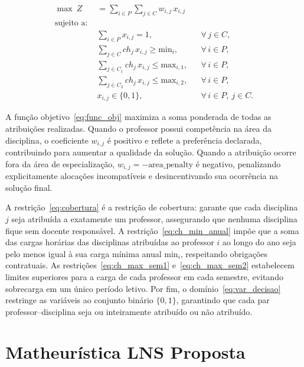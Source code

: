 \begin{subequations} \label{eq:modelo_pdd}
\begin{align}
  \max\ Z \quad & = \sum_{i\in P}\sum_{j\in C} w_{i,j}\,x_{i,j} \label{eq:func_obj} \\[4pt]
  \text{sujeito a:} \nonumber \\
  & \sum_{i\in P} x_{i,j} = 1, && \forall\, j\in C, \label{eq:cobertura} \\
  & \sum_{j\in C} ch_j\,x_{i,j} \ge \text{min}_i, && \forall\, i\in P, \label{eq:ch_min_anual} \\
  & \sum_{j\in C_1} ch_j\,x_{i,j} \le \text{max}_{i,1}, && \forall\, i\in P, \label{eq:ch_max_sem1} \\
  & \sum_{j\in C_2} ch_j\,x_{i,j} \le \text{max}_{i,2}, && \forall\, i\in P, \label{eq:ch_max_sem2} \\
  & x_{i,j} \in \{0,1\}, && \forall\, i\in P,\ j\in C. \label{eq:var_decisao}
\end{align}
\end{subequations}

A função objetivo~\eqref{eq:func_obj} maximiza a soma ponderada de todas as atribuições realizadas. Quando o professor possui competência na área da disciplina, o coeficiente $w_{i,j}$ é positivo e reflete a preferência declarada, contribuindo para aumentar a qualidade da solução. Quando a atribuição ocorre fora da área de especialização, $w_{i,j} = -\text{area\_penalty}$ é negativo, penalizando explicitamente alocações incompatíveis e desincentivando sua ocorrência na solução final.

A restrição~\eqref{eq:cobertura} é a restrição de cobertura: garante que cada disciplina $j$ seja atribuída a exatamente um professor, assegurando que nenhuma disciplina fique sem docente responsável. A restrição~\eqref{eq:ch_min_anual} impõe que a soma das cargas horárias das disciplinas atribuídas ao professor $i$ ao longo do ano seja pelo menos igual à sua carga mínima anual $\text{min}_i$, respeitando obrigações contratuais. As restrições~\eqref{eq:ch_max_sem1} e~\eqref{eq:ch_max_sem2} estabelecem limites superiores para a carga de cada professor em cada semestre, evitando sobrecarga em um único período letivo. Por fim, o domínio~\eqref{eq:var_decisao} restringe as variáveis ao conjunto binário $\{0,1\}$, garantindo que cada par professor--disciplina seja ou inteiramente atribuído ou não atribuído.


\section{Matheurística LNS Proposta}


